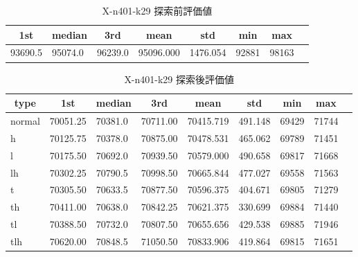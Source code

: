 \begin{table}[htbp]
    \caption{X-n401-k29 探索前評価値}
    \begin{tabular}{|l|l|l|l|l|l|l|l|}\hline
    \multicolumn{1}{|c|}{\textbf{1st}}
    &\multicolumn{1}{c|}{\textbf{median}}
    &\multicolumn{1}{c|}{\textbf{3rd}}
    &\multicolumn{1}{c|}{\textbf{mean}}
    &\multicolumn{1}{c|}{\textbf{std}}
    &\multicolumn{1}{c|}{\textbf{min}}
    &\multicolumn{1}{c|}{\textbf{max}}\\\hline
	93690.5 & 95074.0 & 96239.0 & 95096.000 & 1476.054 & 92881 & 98163\\\hline
	\end{tabular}
\end{table}
\begin{table}[htbp]
    \caption{X-n401-k29 探索後評価値}
    \begin{tabular}{|l|l|l|l|l|l|l|l|l|}\hline
    \multicolumn{1}{|c|}{\textbf{type}}
    &\multicolumn{1}{|c|}{\textbf{1st}}
    &\multicolumn{1}{c|}{\textbf{median}}
    &\multicolumn{1}{c|}{\textbf{3rd}}
    &\multicolumn{1}{c|}{\textbf{mean}}
    &\multicolumn{1}{c|}{\textbf{std}}
    &\multicolumn{1}{c|}{\textbf{min}}
    &\multicolumn{1}{c|}{\textbf{max}}\\\hline
	normal & 70051.25 & 70381.0 & 70711.00 & 70415.719 & 491.148 & 69429 & 71744\\\hline
	h & 70125.75 & 70378.0 & 70875.00 & 70478.531 & 465.062 & 69789 & 71451\\\hline
	l & 70175.50 & 70692.0 & 70939.50 & 70579.000 & 490.658 & 69817 & 71668\\\hline
	lh & 70302.25 & 70790.5 & 70998.50 & 70665.844 & 477.027 & 69558 & 71563\\\hline
	t & 70305.50 & 70633.5 & 70877.50 & 70596.375 & 404.671 & 69805 & 71279\\\hline
	th & 70411.00 & 70638.0 & 70842.25 & 70621.375 & 330.699 & 69884 & 71440\\\hline
	tl & 70388.50 & 70732.0 & 70807.50 & 70655.656 & 429.538 & 69885 & 71946\\\hline
	tlh & 70620.00 & 70848.5 & 71050.50 & 70833.906 & 419.864 & 69815 & 71651\\\hline
	\end{tabular}
\end{table}
